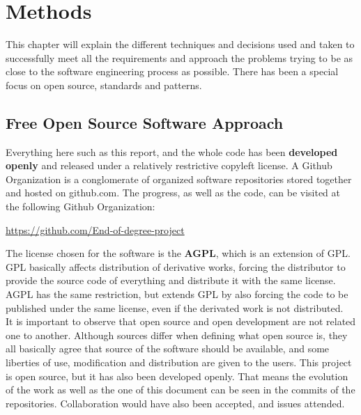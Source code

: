 \section{Methods}
This chapter will explain the different techniques and decisions used and taken to successfully meet all the requirements and approach the problems trying to be as close to the software engineering process as possible. There has been a special focus on open source, standards and patterns.
\subsection{Free Open Source Software Approach}
Everything here such as this report, and the whole code has been \textbf{developed openly} and released under a relatively restrictive copyleft license. A Github Organization is a conglomerate of organized software repositories stored together and hosted on github.com. The progress, as well as the code, can be visited at the following Github Organization:
\begin{center}\url{https://github.com/End-of-degree-project}\end{center}
The license chosen for the software is the \textbf{AGPL}, which is an extension of GPL. GPL basically affects distribution of derivative works, forcing the distributor to provide the source code of everything and distribute it with the same license. AGPL has the same restriction, but extends GPL by also forcing the code to be published under the same license, even if the derivated work is not distributed.\\[.2cm]
It is important to observe that open source and open development are not related one to another. Although sources differ when defining what open source is, they all basically agree that source of the software should be available, and some liberties of use, modification and distribution are given to the users. This project is open source, but it has also been developed openly. That means the evolution of the work as well as the one of this document can be seen in the commits of the repositories. Collaboration would have also been accepted, and issues attended.
